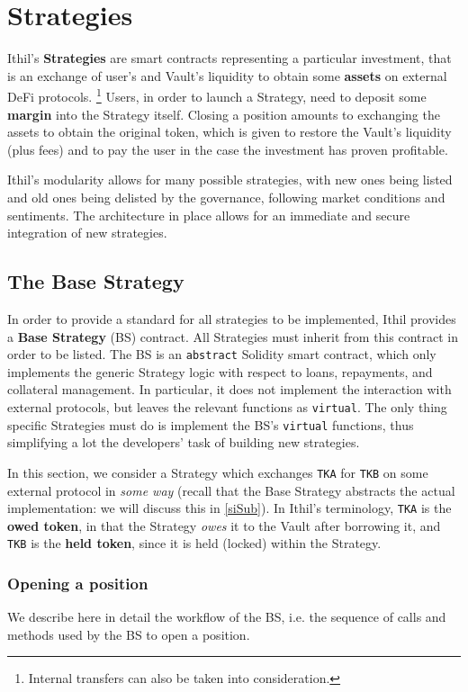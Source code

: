 \documentclass[a4paper,10 pt]{article}
\theoremstyle{definition}
\begin{document}
\section{Strategies}\label{stratSec}

Ithil's {\bf Strategies} are smart contracts representing a particular investment, that is an exchange of user's and Vault's liquidity to obtain some {\bf assets} on external DeFi protocols. \footnote{Internal transfers can also be taken into consideration.} Users, in order to launch a Strategy, need to deposit some {\bf margin} into the Strategy itself. Closing a position amounts to exchanging the assets to obtain the original token, which is given to restore the Vault's liquidity (plus fees) and to pay the user in the case the investment has proven profitable.

Ithil's modularity allows for many possible strategies, with new ones being listed and old ones being delisted by the governance, following market conditions and sentiments. The architecture in place allows for an immediate and secure integration of new strategies.

\subsection{The Base Strategy}\label{asSub}

In order to provide a standard for all strategies to be implemented, Ithil provides a {\bf Base Strategy} (BS) contract. All Strategies must inherit from this contract in order to be listed. The BS is an \verb|abstract| Solidity smart contract, which only implements the generic Strategy logic with respect to loans, repayments, and collateral management. In particular, it does not implement the interaction with external protocols, but leaves the relevant functions as \verb|virtual|. The only thing specific Strategies must do is implement the BS's \verb|virtual| functions, thus simplifying a lot the developers' task of building new strategies.

 In this section, we consider a Strategy which exchanges \verb|TKA| for \verb|TKB| on some external protocol in {\it some way} (recall that the Base Strategy abstracts the actual implementation: we will discuss this in \ref{siSub}). In Ithil's terminology, \verb|TKA| is the {\bf owed token}, in that the Strategy {\it owes} it to the Vault after borrowing it, and \verb|TKB| is the {\bf held token}, since it is held (locked) within the Strategy.

\subsubsection{Opening a position}\label{opSubSub}
We describe here in detail the workflow of the BS, i.e. the sequence of calls and methods used by the BS to open a position.
\end{document}
